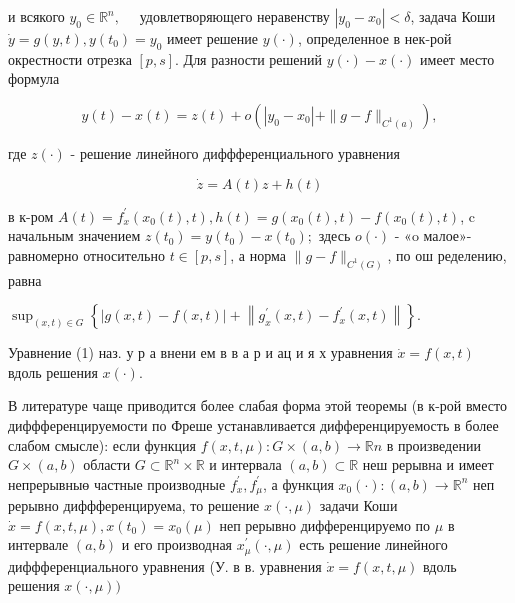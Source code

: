 \documentclass[10pt]{article}
\begin{document}
и всякого $y_{0} \in \mathbb{R}^{n}, \quad$ удовлетворяющего неравенству $\left|y_{0}-x_{0}\right|<\delta$, задача Коши $\dot{y}=g(y, t), y\left(t_{0}\right)=y_{0}$ имеет решение $y(\cdot)$, определенное в нек-рой окрестности отрезка $[p, s]$. Для разности решений $y(\cdot)-x(\cdot)$ имеет место формула



\[

y(t)-x(t)=z(t)+o\left(\left|y_{0}-x_{0}\right|+\|g-f\|_{C^{1}(a)}\right),

\]



где $z(\cdot)$ - решение линейного диффференциального уравнения



\[

\dot{z}=A(t) z+h(t)

\]



в к-ром $A(t)=f_{x}^{\prime}\left(x_{0}(t), t\right), h(t)=g\left(x_{0}(t), t\right)-f\left(x_{0}(t), t\right)$, c начальным значением $z\left(t_{0}\right)=y\left(t_{0}\right)-x\left(t_{0}\right) ;$ здесь $o(\cdot)$ - «o малое»-равномерно относительно $t \in[p, s]$, а норма $\|g-f\|_{C^{1}(G)}$, по ош ределению, равна



$\sup _{(x, t) \in G}\left\{|g(x, t)-f(x, t)|+\left\|g_{x}^{\prime}(x, t)-f_{x}^{\prime}(x, t)\right\|\right\}$.



Уравнение (1) наз. у р а внени ем в в а р и ац и я х уравнения $\dot{x}=f(x, t)$ вдоль решения $x(\cdot)$.



В литературе чаще приводится более слабая форма этой теоремы (в к-рой вместо диффференцируемости по Фреше устанавливается дифференцируемость в более слабом смысле): если функция $f(x, t, \mu): G \times(a, b) \longrightarrow \mathbb{R} n$ в произведении $G \times(a, b)$ области $G \subset \mathbb{R}^{n} \times \mathbb{R}$ и интервала $(a, b) \subset \mathbb{R}$ неш рерывна и имеет непрерывныө частные производные $f_{x}^{\prime}, f_{\mu}^{\prime}$, а функция $x_{0}(\cdot):(a, b) \longrightarrow \mathbb{R}^{n}$ неп рерывно диффференцируема, то решение $x(\cdot, \mu)$ задачи Коши $\dot{x}=f(x, t, \mu), x\left(t_{0}\right)=x_{0}(\mu)$ неп рерывно дифференцируемо по $\mu$ в интервале $(a, b)$ и его производная $x_{\mu}^{\prime}(\cdot, \mu)$ есть решение линейного диффференциального уравнения (У. в в. уравнения $\dot{x}=f(x, t, \mu)$ вдоль решения $x(\cdot, \mu))$
\end{document}
